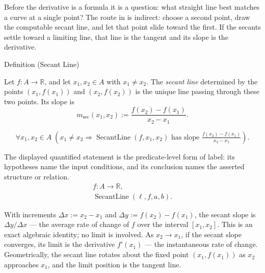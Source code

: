 
\begin{remark*}[Interpretation]
Before the derivative is a formula it is a question: what straight line best
matches a curve at a single point? The route in is indirect: choose a second
point, draw the computable secant line, and let that point slide toward the
first. If the secants settle toward a limiting line, that line is the tangent
and its slope is the derivative.
\end{remark*}

\begin{definitionbox}{Definition (Secant Line)}
\begin{definition}
\label{def:secant-line}
Let $f : A \to \mathbb{R}$, and let $x_1, x_2 \in A$ with $x_1 \neq x_2$. The \emph{secant line} determined by the points $(x_1, f(x_1))$ and $(x_2, f(x_2))$ is the unique line passing through these two points. Its slope is
\[
m_{\mathrm{sec}}(x_1, x_2) := \frac{f(x_2) - f(x_1)}{x_2 - x_1}.
\]
\end{definition}
\end{definitionbox}

\begin{remark*}
\[
\forall x_1, x_2 \in A\;(x_1 \neq x_2 \Rightarrow \operatorname{SecantLine}(f, x_1, x_2)
\text{ has slope } \tfrac{f(x_2)-f(x_1)}{x_2-x_1}).
\]
\end{remark*}

\begin{remark*}
The displayed quantified statement is the predicate-level form of label: its hypotheses name the input conditions, and its conclusion names the asserted structure or relation.
\[
\begin{aligned}
  f\colon A\to\mathbb{R},\\
  \operatorname{SecantLine}(\ell,f,a,b).
\end{aligned}
\]
\end{remark*}

\begin{remark*}[Interpretation]
With increments $\Delta x := x_2 - x_1$ and $\Delta y := f(x_2) - f(x_1)$, the secant slope is $\Delta y / \Delta x$ --- the average rate of change of $f$ over the interval $[x_1, x_2]$. This is an exact algebraic identity; no limit is involved. As $x_2 \to x_1$, if the secant slope converges, its limit is the derivative $f'(x_1)$ --- the instantaneous rate of change. Geometrically, the secant line rotates about the fixed point $(x_1, f(x_1))$ as $x_2$ approaches $x_1$, and the limit position is the tangent line.
\end{remark*}

